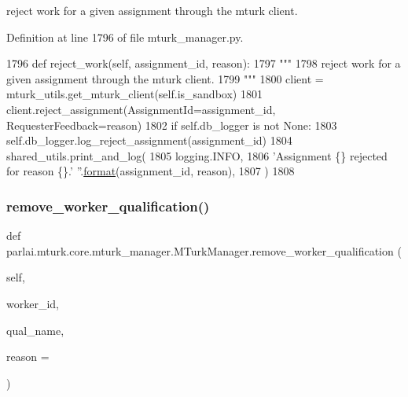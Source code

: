 \begin{DoxyVerb}reject work for a given assignment through the mturk client.
\end{DoxyVerb}
 

Definition at line 1796 of file mturk\+\_\+manager.\+py.


\begin{DoxyCode}
1796     \textcolor{keyword}{def }reject\_work(self, assignment\_id, reason):
1797         \textcolor{stringliteral}{"""}
1798 \textcolor{stringliteral}{        reject work for a given assignment through the mturk client.}
1799 \textcolor{stringliteral}{        """}
1800         client = mturk\_utils.get\_mturk\_client(self.is\_sandbox)
1801         client.reject\_assignment(AssignmentId=assignment\_id, RequesterFeedback=reason)
1802         \textcolor{keywordflow}{if} self.db\_logger \textcolor{keywordflow}{is} \textcolor{keywordflow}{not} \textcolor{keywordtype}{None}:
1803             self.db\_logger.log\_reject\_assignment(assignment\_id)
1804         shared\_utils.print\_and\_log(
1805             logging.INFO,
1806             \textcolor{stringliteral}{'Assignment \{\} rejected for reason \{\}.'} \textcolor{stringliteral}{''}.\hyperlink{namespaceparlai_1_1chat__service_1_1services_1_1messenger_1_1shared__utils_a32e2e2022b824fbaf80c747160b52a76}{format}(assignment\_id, reason),
1807         )
1808 
\end{DoxyCode}
\mbox{\label{classparlai_1_1mturk_1_1core_1_1mturk__manager_1_1MTurkManager_aa96771f455f9e041b4d0105ef20de99a}} 
\subsubsection{\texorpdfstring{remove\+\_\+worker\+\_\+qualification()}{remove\_worker\_qualification()}}
{\footnotesize\ttfamily def parlai.\+mturk.\+core.\+mturk\+\_\+manager.\+M\+Turk\+Manager.\+remove\+\_\+worker\+\_\+qualification (\begin{DoxyParamCaption}\item[{}]{self,  }\item[{}]{worker\+\_\+id,  }\item[{}]{qual\+\_\+name,  }\item[{}]{reason = {\ttfamily \textquotesingle{}\textquotesingle{}} }\end{DoxyParamCaption})}

